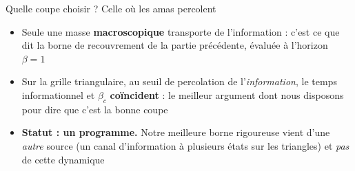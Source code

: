 \begin{frame}[t]{Quelle coupe choisir ? Celle où les amas \textcolor{inria-rouge}{percolent}}
    \vspace{-0.10cm}
    \begin{center}
        \resizebox{0.36\textwidth}{!}{}
    \end{center}

    \vspace{0.02cm}
    \begin{center}
    \end{center}

    \vspace{0.02cm}
    \footnotesize
    \begin{itemize}
        \setlength{\itemsep}{2pt}
        \item Seule une masse \textbf{macroscopique} transporte de l'information : c'est ce que dit
        la borne de recouvrement de la partie précédente, évaluée à l'horizon $\beta = 1$
        \item Sur la grille triangulaire, au seuil de percolation de l'\emph{information}, le temps
        informationnel et $\beta_c$ \textbf{coïncident}  : le meilleur argument dont nous
        disposons pour dire que c'est la bonne coupe
        \item \textbf{Statut : un programme.} Notre meilleure borne rigoureuse vient d'une \emph{autre}
        source (un canal d'information à plusieurs états sur les triangles) et \emph{pas} de cette dynamique
    \end{itemize}
\end{frame}

